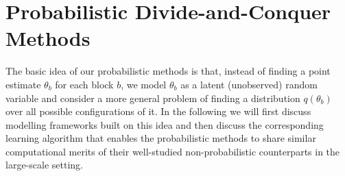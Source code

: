 \documentclass{article}
\newcommand{\1}[0]{\ensuremath{\boldsymbol{1}}\xspace}
\begin{document}

\section{Probabilistic Divide-and-Conquer Methods}\label{proposed_frameworks}

The basic idea of our probabilistic methods is that, instead of finding a point estimate $\theta_b$ for each block $b$, we model $\theta_b$ as a latent (unobserved) random variable and consider a more general problem of finding a distribution $q(\theta_b)$ over all possible configurations of it. In the following we will first discuss modelling frameworks built on this idea and then discuss the corresponding learning algorithm that enables the probabilistic methods to share similar computational merits of their well-studied non-probabilistic counterparts in the large-scale setting.
\end{document}
